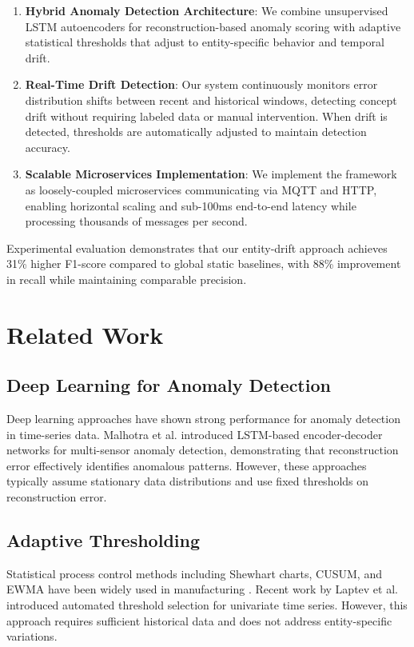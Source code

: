 \documentclass[conference]{IEEEtran}
\begin{document}
\begin{enumerate}
\item \textbf{Hybrid Anomaly Detection Architecture}: We combine unsupervised LSTM autoencoders for reconstruction-based anomaly scoring with adaptive statistical thresholds that adjust to entity-specific behavior and temporal drift.

\item \textbf{Real-Time Drift Detection}: Our system continuously monitors error distribution shifts between recent and historical windows, detecting concept drift without requiring labeled data or manual intervention. When drift is detected, thresholds are automatically adjusted to maintain detection accuracy.

\item \textbf{Scalable Microservices Implementation}: We implement the framework as loosely-coupled microservices communicating via MQTT and HTTP, enabling horizontal scaling and sub-100ms end-to-end latency while processing thousands of messages per second.
\end{enumerate}

Experimental evaluation demonstrates that our entity-drift approach achieves 31\% higher F1-score compared to global static baselines, with 88\% improvement in recall while maintaining comparable precision.

\section{Related Work}

\subsection{Deep Learning for Anomaly Detection}

Deep learning approaches have shown strong performance for anomaly detection in time-series data. Malhotra et al. \cite{malhotra2015lstm} introduced LSTM-based encoder-decoder networks for multi-sensor anomaly detection, demonstrating that reconstruction error effectively identifies anomalous patterns. However, these approaches typically assume stationary data distributions and use fixed thresholds on reconstruction error.

\subsection{Adaptive Thresholding}

Statistical process control methods including Shewhart charts, CUSUM, and EWMA have been widely used in manufacturing \cite{montgomery2012}. Recent work by Laptev et al. \cite{laptev2015} introduced automated threshold selection for univariate time series. However, this approach requires sufficient historical data and does not address entity-specific variations.
\end{document}
